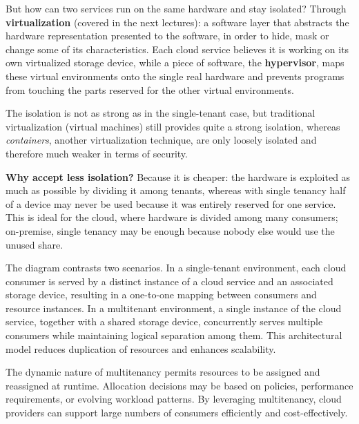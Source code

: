 \begin{center}
\end{center}

But how can two services run on the same hardware and stay isolated? Through \textbf{virtualization} (covered in the next lectures): a software layer that abstracts the hardware representation presented to the software, in order to hide, mask or change some of its characteristics. Each cloud service believes it is working on its own virtualized storage device, while a piece of software, the \textbf{hypervisor}, maps these virtual environments onto the single real hardware and prevents programs from touching the parts reserved for the other virtual environments.

The isolation is not as strong as in the single-tenant case, but traditional virtualization (virtual machines) still provides quite a strong isolation, whereas \emph{containers}, another virtualization technique, are only loosely isolated and therefore much weaker in terms of security.

\begin{notebox}
	\textbf{Why accept less isolation?} Because it is cheaper: the hardware is exploited as much as possible by dividing it among tenants, whereas with single tenancy half of a device may never be used because it was entirely reserved for one service. This is ideal for the cloud, where hardware is divided among many consumers; on-premise, single tenancy may be enough because nobody else would use the unused share.
\end{notebox}

The diagram contrasts two scenarios. In a single-tenant environment, each cloud consumer is served by a distinct instance of a cloud service and an associated storage device, resulting in a one-to-one mapping between consumers and resource instances. In a multitenant environment, a single instance of the cloud service, together with a shared storage device, concurrently serves multiple consumers while maintaining logical separation among them. This architectural model reduces duplication of resources and enhances scalability.

The dynamic nature of multitenancy permits resources to be assigned and reassigned at runtime. Allocation decisions may be based on policies, performance requirements, or evolving workload patterns. By leveraging multitenancy, cloud providers can support large numbers of consumers efficiently and cost-effectively.

